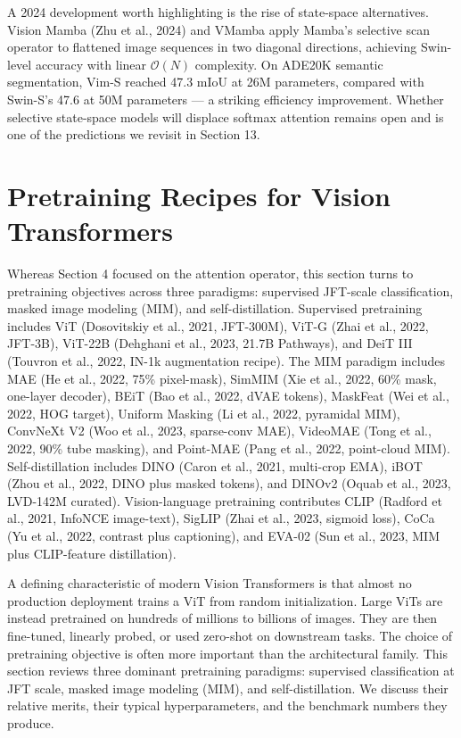 A 2024 development worth highlighting is the rise of state-space alternatives. Vision Mamba (Zhu et al., 2024) and VMamba apply Mamba's selective scan operator to flattened image sequences in two diagonal directions, achieving Swin-level accuracy with linear \(\mathcal{O}(N)\) complexity. On ADE20K semantic segmentation, Vim-S reached 47.3 mIoU at 26M parameters, compared with Swin-S's 47.6 at 50M parameters --- a striking efficiency improvement. Whether selective state-space models will displace softmax attention remains open and is one of the predictions we revisit in Section 13.

\section{Pretraining Recipes for Vision Transformers}\label{pretraining-recipes-for-vision-transformers}

Whereas Section 4 focused on the attention operator, this section turns to pretraining objectives across three paradigms: supervised JFT-scale classification, masked image modeling (MIM), and self-distillation. Supervised pretraining includes ViT (Dosovitskiy et al., 2021, JFT-300M), ViT-G (Zhai et al., 2022, JFT-3B), ViT-22B (Dehghani et al., 2023, 21.7B Pathways), and DeiT III (Touvron et al., 2022, IN-1k augmentation recipe). The MIM paradigm includes MAE (He et al., 2022, 75\% pixel-mask), SimMIM (Xie et al., 2022, 60\% mask, one-layer decoder), BEiT (Bao et al., 2022, dVAE tokens), MaskFeat (Wei et al., 2022, HOG target), Uniform Masking (Li et al., 2022, pyramidal MIM), ConvNeXt V2 (Woo et al., 2023, sparse-conv MAE), VideoMAE (Tong et al., 2022, 90\% tube masking), and Point-MAE (Pang et al., 2022, point-cloud MIM). Self-distillation includes DINO (Caron et al., 2021, multi-crop EMA), iBOT (Zhou et al., 2022, DINO plus masked tokens), and DINOv2 (Oquab et al., 2023, LVD-142M curated). Vision-language pretraining contributes CLIP (Radford et al., 2021, InfoNCE image-text), SigLIP (Zhai et al., 2023, sigmoid loss), CoCa (Yu et al., 2022, contrast plus captioning), and EVA-02 (Sun et al., 2023, MIM plus CLIP-feature distillation).

A defining characteristic of modern Vision Transformers is that almost no production deployment trains a ViT from random initialization. Large ViTs are instead pretrained on hundreds of millions to billions of images. They are then fine-tuned, linearly probed, or used zero-shot on downstream tasks. The choice of pretraining objective is often more important than the architectural family. This section reviews three dominant pretraining paradigms: supervised classification at JFT scale, masked image modeling (MIM), and self-distillation. We discuss their relative merits, their typical hyperparameters, and the benchmark numbers they produce.

